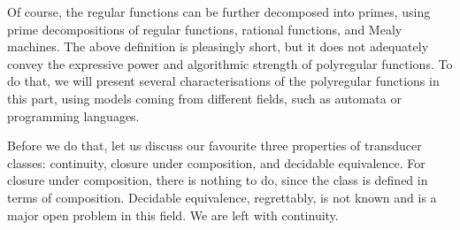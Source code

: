 Of course, the regular functions can be further decomposed into primes, using prime decompositions of regular functions, rational functions, and Mealy machines. The above definition is pleasingly short, but it does not adequately convey the expressive power and algorithmic strength of polyregular functions. To do that, we will present several characterisations of the polyregular functions in this part, using models coming from different fields, such as automata or programming languages.

Before we do that, let us discuss our favourite three properties of transducer classes: continuity, closure under composition, and decidable equivalence. For closure under composition, there is nothing to do, since the class is defined in terms of composition. Decidable equivalence, regrettably, is not known and is a major open problem in this field. We are left with continuity.

